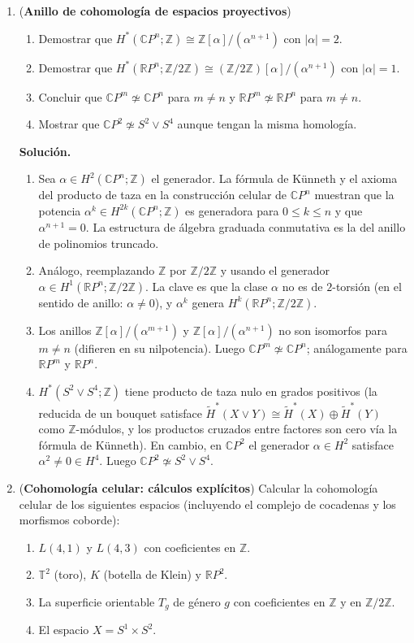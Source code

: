 \documentclass[11pt,a4paper]{article}
\theoremstyle{plain}
\theoremstyle{definition}
\theoremstyle{remark}
\newcommand{\RR}{\mathbb R}
\newcommand{\ZZ}{\mathbb Z}
\newcommand{\CC}{\mathbb C}
\begin{document}
\begin{enumerate}[label=\arabic*.,leftmargin=*]
\item (\textbf{Anillo de cohomología de espacios proyectivos})
\label{ex:anillo-proyectivos}
\begin{enumerate}[label=\alph*)]
\item Demostrar que $H^*(\CC P^n;\ZZ)\cong\ZZ[\alpha]/(\alpha^{n+1})$ con
$|\alpha|=2$.
\item Demostrar que $H^*(\RR P^n;\ZZ/2\ZZ)\cong(\ZZ/2\ZZ)[\alpha]/(\alpha^{n+1})$
con $|\alpha|=1$.
\item Concluir que $\CC P^m\not\simeq\CC P^n$ para $m\ne n$ y
$\RR P^m\not\simeq\RR P^n$ para $m\ne n$.
\item Mostrar que $\CC P^2\not\simeq S^2\vee S^4$ aunque tengan la misma
homología.
\end{enumerate}

\noindent\textbf{Solución.}
\begin{enumerate}[label=\alph*)]
\item Sea $\alpha\in H^2(\CC P^n;\ZZ)$ el generador. La fórmula de Künneth
y el axioma del producto de taza en la construcción celular de $\CC P^n$
muestran que la potencia $\alpha^k\in H^{2k}(\CC P^n;\ZZ)$ es generadora
para $0\le k\le n$ y que $\alpha^{n+1}=0$. La estructura de álgebra
graduada conmutativa es la del anillo de polinomios truncado.
\item Análogo, reemplazando $\ZZ$ por $\ZZ/2\ZZ$ y usando el generador
$\alpha\in H^1(\RR P^n;\ZZ/2\ZZ)$. La clave es que la clase $\alpha$ no es
de $2$-torsión (en el sentido de anillo: $\alpha\ne0$), y $\alpha^k$ genera
$H^k(\RR P^n;\ZZ/2\ZZ)$.
\item Los anillos $\ZZ[\alpha]/(\alpha^{m+1})$ y $\ZZ[\alpha]/(\alpha^{n+1})$
no son isomorfos para $m\ne n$ (difieren en su nilpotencia). Luego
$\CC P^m\not\simeq\CC P^n$; análogamente para $\RR P^m$ y $\RR P^n$.
\item $H^*(S^2\vee S^4;\ZZ)$ tiene producto de taza nulo en grados
positivos (la reducida de un bouquet satisface
$\tilde H^*(X\vee Y)\cong\tilde H^*(X)\oplus\tilde H^*(Y)$ como
$\ZZ$-módulos, y los productos cruzados entre factores son cero vía la
fórmula de Künneth). En cambio, en $\CC P^2$ el generador $\alpha\in H^2$
satisface $\alpha^2\ne0\in H^4$. Luego $\CC P^2\not\simeq S^2\vee S^4$.
\end{enumerate}

\item (\textbf{Cohomología celular: cálculos explícitos}) Calcular la
cohomología celular de los siguientes espacios (incluyendo el complejo de
cocadenas y los morfismos coborde):
\begin{enumerate}[label=\alph*)]
\item $L(4,1)$ y $L(4,3)$ con coeficientes en $\ZZ$.
\item $\mathbb T^2$ (toro), $K$ (botella de Klein) y $\RR P^2$.
\item La superficie orientable $T_g$ de género $g$ con coeficientes en
$\ZZ$ y en $\ZZ/2\ZZ$.
\item El espacio $X=S^1\times S^2$.
\end{enumerate}


\end{enumerate}
\end{document}
